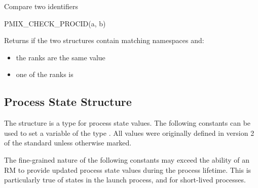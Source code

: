 Compare two  identifiers

\cspecificstart
\begin{codepar}
PMIX_CHECK_PROCID(a, b)
\end{codepar}
\cspecificend

\begin{arglist}
\end{arglist}

Returns  if the two structures contain matching namespaces and:

\begin{itemize}
    \item the ranks are the same value
    \item one of the ranks is 
\end{itemize}


\subsection{Process State Structure}
\label{api:struct:processstate}

The  structure is a  type for process state values. The following constants can be used to set a variable of the type . All values were originally defined in version 2 of the standard unless otherwise marked.

\adviceuserstart
The fine-grained nature of the following constants may exceed the ability of an \ac{RM} to provide updated process state values during the process lifetime. This is particularly true of states in the launch process, and for short-lived processes.
\adviceuserend

